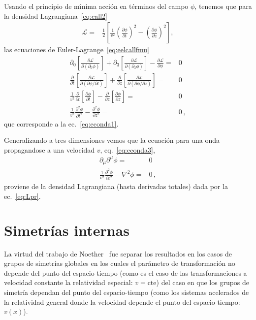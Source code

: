 Usando el principio de m\'\i nima acci\'on en t\'erminos del campo $\phi$, tenemos que para la densidad Lagrangiana~\eqref{eq:call2}
\begin{align}
  \mathcal{L}=&\frac{1}{2}  \left[
  \frac{1}{v^2}\left(\frac{\partial\phi}{\partial t}\right)^2-\left(\frac{\partial\phi}{\partial z}\right)^2
\right],
\end{align}
las ecuaciones de Euler-Lagrange~\eqref{eq:eelcallfmu}
\begin{align}
  \partial_0\left[\frac{\partial\mathcal{L}}{\partial(\partial_0\phi)}\right]+
\partial_3\left[\frac{\partial\mathcal{L}}{\partial(\partial_3\phi)}\right]
-\frac{\partial\mathcal{L}}{\partial\phi}=&0\nonumber\\
  \frac{\partial}{\partial t}\left[\frac{\partial\mathcal{L}}{\partial(\partial\phi/\partial t)}\right]+
\frac{\partial}{\partial z}\left[\frac{\partial\mathcal{L}}{\partial(\partial\phi/\partial z)}\right]
=&0\nonumber\\
 \frac{1}{v^2}\frac{\partial}{\partial t}\left[\frac{\partial\phi}{\partial t}\right]
-\frac{\partial}{\partial z}\left[\frac{\partial\phi}{\partial z}\right]=&0\nonumber\\
 \frac{1}{v^2}\frac{\partial^2\phi}{\partial t^2}-\frac{\partial^2\phi}{\partial z^2}=&0\,,
\end{align}
que corresponde a la ec.~\eqref{eq:econda1}.

Generalizando a tres dimensiones vemos que la ecuaci\'on para una onda propagandose a una velocidad $v$, eq.~\eqref{eq:econda3},  
\begin{align}
     \partial_{\mu}\partial^{\mu}\phi=&0 \nonumber\\
     \frac{1}{v^2}\frac{\partial^2\phi}{\partial t^2}-\nabla^2\phi=&0\,,
\end{align}
proviene de la densidad Lagrangiana (hasta derivadas totales) dada por la ec.~\eqref{eq:Lpr}.

\section{Simetrías internas}
La virtud del trabajo de Noether~\cite{Noether} fue separar los resultados  en los casos de grupos de simetrías globales en los cuales el parámetro de transformación no depende del punto del espacio tiempo (como es el caso de las transformaciones a velocidad constante la relatividad especial: $v=\text{cte}$) del caso en que los grupos de simetría dependan del punto del espacio-tiempo (como los sistemas acelerados de la relatividad general donde la velocidad depende el punto del espacio-tiempo: $v(x)$).

